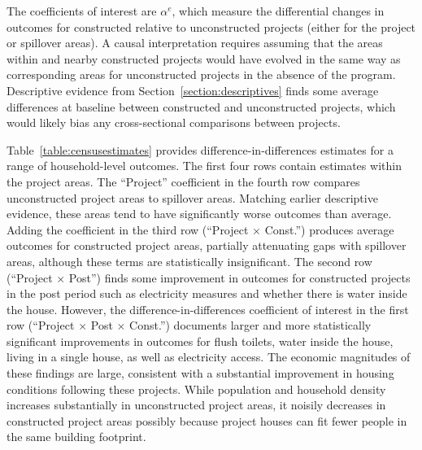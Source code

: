 \documentclass[12pt]{article}
\begin{document}
The coefficients of interest are $\alpha^e$, which measure the differential changes in outcomes for constructed relative to unconstructed projects (either for the project or spillover areas).  A causal interpretation requires assuming that the areas within and nearby constructed projects would have evolved in the same way as corresponding areas for unconstructed projects in the absence of the program.  Descriptive evidence from Section~\ref{section:descriptives} finds some average differences at baseline between constructed and unconstructed projects, which would likely bias any cross-sectional comparisons between projects. 


Table~\ref{table:censusestimates} provides difference-in-differences estimates for a range of household-level outcomes.  The first four rows contain estimates within the project areas.  The ``Project'' coefficient in the fourth row compares unconstructed project areas to spillover areas.  Matching earlier descriptive evidence, these areas tend to have significantly worse outcomes than average.  Adding the coefficient in the third row (``Project $\times$ Const.'') produces average outcomes for constructed project areas, partially attenuating gaps with spillover areas, although these terms are statistically insignificant.  The second row (``Project $\times$ Post'') finds some improvement in outcomes for constructed projects in the post period such as electricity measures and whether there is water inside the house.  However, the difference-in-differences coefficient of interest in the first row (``Project $\times$ Post $\times$ Const.'') documents larger and more statistically significant improvements in outcomes for flush toilets, water inside the house, living in a single house, as well as electricity access.  The economic magnitudes of these findings are large, consistent with a substantial improvement in housing conditions following these projects.  While population and household density increases substantially in unconstructed project areas, it noisily decreases in constructed project areas possibly because project houses can fit fewer people in the same building footprint.
\end{document}
